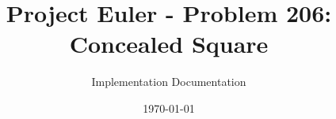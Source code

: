 
\title{Project Euler - Problem 206: Concealed Square}
\author{Implementation Documentation}
\date{\today}
